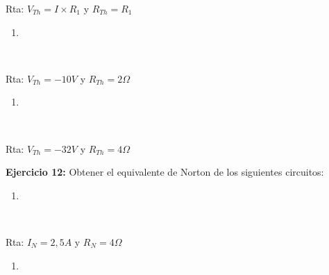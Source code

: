 \documentclass[11pt]{article}
\providecommand{\tightlist}{%
      \setlength{\itemsep}{0pt}\setlength{\parskip}{0pt}}
\begin{document}
    Rta: \(V_{Th}=I \times R_{1}\) y \(R_{Th}= R_1\)

    \begin{enumerate}
\def\labelenumi{\alph{enumi})}
\setcounter{enumi}{1}
\tightlist
\item
\end{enumerate}

    \begin{center}
    \end{center}
    { \hspace*{\fill} \\}
    
    Rta: \(V_{Th}=-10V\) y \(R_{Th}=2\Omega\)

\begin{enumerate}
\def\labelenumi{\alph{enumi})}
\setcounter{enumi}{2}
\tightlist
\item
\end{enumerate}

    \begin{center}
    \end{center}
    { \hspace*{\fill} \\}
    
    Rta: \(V_{Th}=-32V\) y \(R_{Th}=4\Omega\)

\textbf{Ejercicio 12:} Obtener el equivalente de Norton de los
siguientes circuitos:

\begin{enumerate}
\def\labelenumi{\alph{enumi})}
\tightlist
\item
\end{enumerate}

    \begin{center}
    \end{center}
    { \hspace*{\fill} \\}
    
    Rta: \(I_{N}=2,5A\) y \(R_{N}=4\Omega\)

\begin{enumerate}
\def\labelenumi{\alph{enumi})}
\setcounter{enumi}{1}
\tightlist
\item
\end{enumerate}
\end{document}

